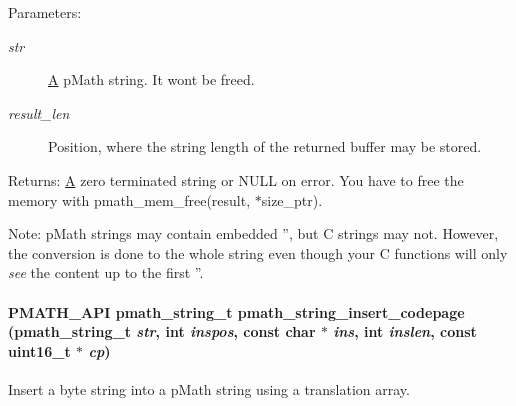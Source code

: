 \begin{Desc}
\item[Parameters:]
\begin{description}
\item[{\em str}]\hyperlink{class_a}{A} pMath string. It wont be freed. \item[{\em result\_\-len}]Position, where the string length of the returned buffer may be stored. \end{description}
\end{Desc}
\begin{Desc}
\item[Returns:]\hyperlink{class_a}{A} zero terminated string or NULL on error. You have to free the memory with pmath\_\-mem\_\-free(result, $\ast$size\_\-ptr).\end{Desc}
\begin{Desc}
\item[Note:]pMath strings may contain embedded '', but C strings may not. However, the conversion is done to the whole string even though your C functions will only {\em see\/} the content up to the first ''. \end{Desc}
\hypertarget{group__strings_g5008b0b2e682b283772e10bf38666ffe}{
\paragraph[{pmath\_\-string\_\-insert\_\-codepage}]{\setlength{\rightskip}{0pt plus 5cm}PMATH\_\-API {\bf pmath\_\-string\_\-t} pmath\_\-string\_\-insert\_\-codepage ({\bf pmath\_\-string\_\-t} {\em str}, \/  int {\em inspos}, \/  const char $\ast$ {\em ins}, \/  int {\em inslen}, \/  const uint16\_\-t $\ast$ {\em cp})}\hfill}
\label{group__strings_g5008b0b2e682b283772e10bf38666ffe}


Insert a byte string into a pMath string using a translation array. 

